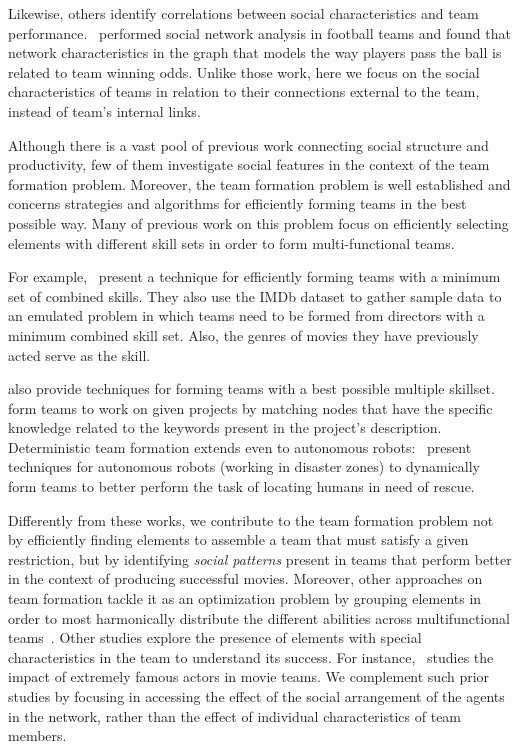 Likewise, others identify correlations between social characteristics and team
performance.~\cite{grund2012network} performed social network analysis in
football teams and found that network characteristics in the graph that models
the way players pass the ball is related to team winning odds. Unlike those
work, here we focus on the social characteristics of teams in relation to their
connections external to the team, instead of team's internal links.

Although there is a vast pool of previous work connecting social structure and
productivity, few of them investigate social features in the context of the
team formation problem. Moreover, the team formation problem is well
established and concerns strategies and algorithms for efficiently forming
teams in the best possible way. Many of previous work on this problem focus on
efficiently selecting elements with different skill sets in order to form
multi-functional teams.

For example,~\cite{anagnostopoulos2012online} present a technique for
efficiently forming teams with a minimum set of combined skills. They also use
the IMDb dataset to gather sample data to an emulated problem in which teams
need to be formed from directors with a minimum combined skill set. Also, the
genres of movies they have previously acted serve as the skill.

\cite{tseng2004novel} also provide techniques for forming teams with a best
possible multiple skillset.~\cite{wi2009team} form teams to work on given
projects by matching nodes that have the specific knowledge related to the
keywords present in the project's description.  Deterministic team formation
extends even to autonomous robots:~\cite{GunnA15} present techniques for
autonomous robots (working in disaster zones) to dynamically form teams to
better perform the task of locating humans in need of rescue.

Differently from these works, we contribute to the team formation problem not
by efficiently finding elements to assemble a team that must satisfy a given
restriction, but by identifying \textit{social patterns} present in teams that
perform better in the context of producing successful movies. Moreover, other
approaches on team formation tackle it as an optimization problem by grouping
elements in order to most harmonically distribute the different abilities
across multifunctional teams~\citep{anagnostopoulos2012online}. Other studies
explore the presence of elements with special characteristics in the team to
understand its success. For instance,~\cite{elberse2007power} studies the
impact of extremely famous actors in movie teams. We complement such prior
studies by focusing in accessing the effect of the social arrangement of the
agents in the network, rather than the effect of individual characteristics of
team members.
